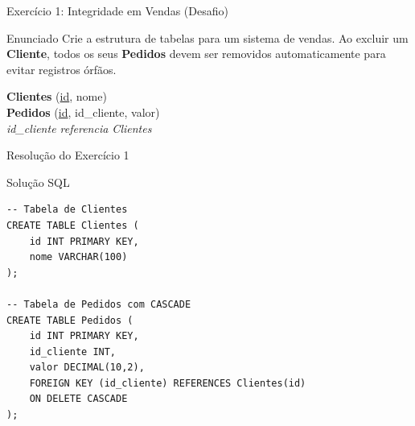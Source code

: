 \documentclass[9pt]{beamer}
\begin{document}
\begin{frame}{Exercício 1: Integridade em Vendas (Desafio)}
  \begin{block}{Enunciado}
    Crie a estrutura de tabelas para um sistema de vendas. Ao excluir um \textbf{Cliente}, todos os seus \textbf{Pedidos} devem ser removidos automaticamente para evitar registros órfãos.
  \end{block}
  \vspace{0.4cm}
  \centering
  
  \vspace{0.3cm}
  \centering
  \small
  \textbf{Clientes} (\underline{id}, nome) \\
  \textbf{Pedidos} (\underline{id}, id\_cliente, valor) \\
  \textit{id\_cliente referencia Clientes}
\end{frame}

\begin{frame}[fragile]{Resolução do Exercício 1}
  \begin{exampleblock}{Solução SQL}
\begin{lstlisting}
-- Tabela de Clientes
CREATE TABLE Clientes (
    id INT PRIMARY KEY,
    nome VARCHAR(100)
);

-- Tabela de Pedidos com CASCADE
CREATE TABLE Pedidos (
    id INT PRIMARY KEY,
    id_cliente INT,
    valor DECIMAL(10,2),
    FOREIGN KEY (id_cliente) REFERENCES Clientes(id)
    ON DELETE CASCADE
);
\end{lstlisting}
  \end{exampleblock}
\end{frame}
\end{document}

